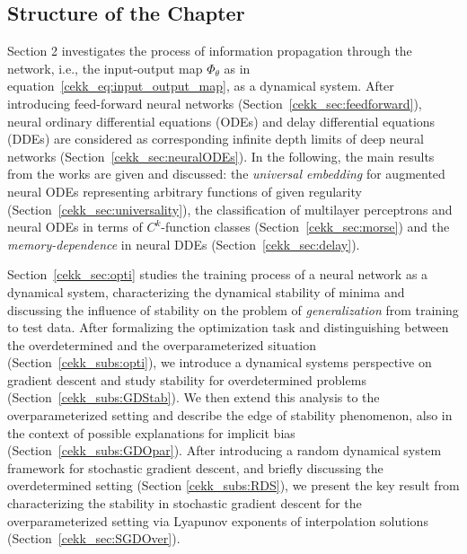 \documentclass[10pt]{article}
\begin{document}
\subsection{Structure of the Chapter}

Section 2 investigates the process of information propagation through the network, i.e., the input-output map $\Phi_\theta$ as in equation~\eqref{cekk_eq:input_output_map}, as a dynamical system.
After introducing feed-forward neural networks (Section~\ref{cekk_sec:feedforward}), neural ordinary differential equations (ODEs) and delay differential equations (DDEs) are considered as corresponding infinite depth limits of deep neural networks (Section~\ref{cekk_sec:neuralODEs}). In the following, the main results from the works \cite{KuehnKuntz2023, KuehnKuntz2024, KuehnKuntz2025} are given and discussed: the \emph{universal embedding} for augmented neural ODEs representing arbitrary functions of given regularity (Section~\ref{cekk_sec:universality}), the classification of multilayer perceptrons and neural ODEs in terms of $C^k$-function classes (Section~\ref{cekk_sec:morse}) and the \emph{memory-dependence} in neural DDEs (Section~\ref{cekk_sec:delay}).

Section~\ref{cekk_sec:opti} studies the training process of a neural network as a dynamical system, characterizing the dynamical stability of minima and discussing the influence of stability on the problem of \emph{generalization} from training to test data. After formalizing the optimization task and distinguishing between the overdetermined and the overparameterized situation (Section~\ref{cekk_subs:opti}), we introduce a dynamical systems perspective on gradient descent and study stability for overdetermined problems (Section~\ref{cekk_subs:GDStab}). 
We then extend this analysis to the overparameterized setting and describe the edge of stability phenomenon, also in the context of possible explanations for implicit bias (Section~\ref{cekk_subs:GDOpar}). After introducing a random dynamical system framework for stochastic gradient descent, and briefly discussing the overdetermined setting (Section \ref{cekk_subs:RDS}), we present the key result from \cite{ChemnitzEngel24} characterizing the stability in stochastic gradient descent for the overparameterized setting via Lyapunov exponents of interpolation solutions (Section~\ref{cekk_sec:SGDOver}).
\end{document}
